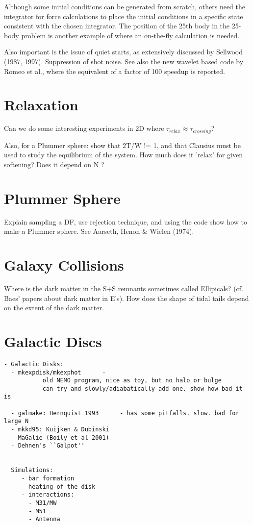 Although some initial conditions can be generated from scratch, others need the
integrator for force calculations to place the initial conditions in a
specific state consistent with the chosen integrator. The position of the 25th
body in the 25-body problem is another example of where an on-the-fly calculation
is needed.

Also important is the issue of quiet starts, as extensively
discussed by Sellwood (1987, 1997). Suppression of shot noise.
See also the new wavelet based code by Romeo et al., where the
equivalent of a factor of 100 speedup is reported.

\section{Relaxation}

Can we do some interesting experiments in 2D where $\tau_{relax} \approx \tau_{crossing}$?


Also, for a Plummer sphere: show that 2T/W != 1, and that Clausius must be used to study
the equilibrium of the system. How much does it 'relax' for given softening?
Does it depend on N ?


\section{Plummer Sphere}

Explain sampling a DF, use rejection technique, and
using the code show how to make a Plummer sphere. See
Aarseth, Henon \& Wielen (1974).

\section{Galaxy Collisions}


Where is the dark matter in the S+S remnants sometimes called Ellipicals?
(cf. Baes' papers about dark matter in E's). How does the shape
of tidal tails depend on the extent of the dark matter.


\section{Galactic Discs}

\footnotesize\begin{verbatim}
- Galactic Disks:
  - mkexpdisk/mkexphot      - 
           old NEMO program, nice as toy, but no halo or bulge
           can try and slowly/adiabatically add one. show how bad it is

  - galmake: Hernquist 1993      - has some pitfalls. slow. bad for large N
  - mkkd95: Kuijken & Dubinski
  - MaGalie (Boily et al 2001) 
  - Dehnen's ``Galpot''


  Simulations:
     - bar formation
     - heating of the disk
     - interactions:
       - M31/MW
       - M51
       - Antenna
\end{verbatim}\normalsize



